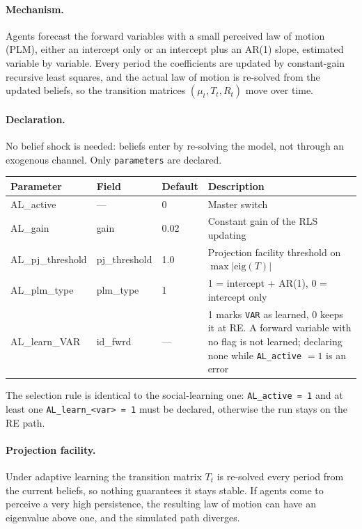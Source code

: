 \documentclass[11pt,a4paper]{article}
\newcommand{\command}[1]{\texttt{#1}}
\begin{document}
\paragraph{Mechanism.} Agents forecast the forward variables with a small
perceived law of motion (PLM), either an intercept only or an intercept plus an
AR(1) slope, estimated variable by variable. Every period the coefficients are
updated by constant-gain recursive least squares, and the actual law of motion
is re-solved from the updated beliefs, so the transition matrices
$(\mu_t, T_t, R_t)$ move over time.


\paragraph{Declaration.} No belief shock is needed: beliefs enter by re-solving
the model, not through an exogenous channel. Only \command{parameters} are
declared.

\begin{longtable}{>{\ttfamily\small}p{4.6cm} >{\ttfamily\small}p{3.2cm} p{1.6cm} p{4.6cm}}
\toprule
\normalfont\textbf{Parameter} & \normalfont\textbf{Field} &
\normalfont\textbf{Default} & \normalfont\textbf{Description} \\
\midrule
\endhead
AL\_active        & ---           & 0    & Master switch \\
AL\_gain          & gain          & 0.02 & Constant gain of the RLS updating \\
AL\_pj\_threshold & pj\_threshold & 1.0  & Projection facility threshold on $\max|\mathrm{eig}(T)|$ \\
AL\_plm\_type     & plm\_type     & 1    & 1 = intercept + AR(1), 0 = intercept only \\
AL\_learn\_VAR    & id\_fwrd      & ---  & 1 marks \texttt{VAR} as learned, 0 keeps it at RE. A forward variable with no flag is not learned; declaring none while \texttt{AL\_active} $=1$ is an error \\
\bottomrule
\end{longtable}

\noindent
The selection rule is identical to the social-learning one: \texttt{AL\_active
= 1} and at least one \texttt{AL\_learn\_<var> = 1} must be declared, otherwise
the run stays on the RE path.


\paragraph{Projection facility.} Under adaptive learning the transition matrix
$T_t$ is re-solved every period from the current beliefs, so nothing guarantees
it stays stable. If agents come to perceive a very high persistence, the
resulting law of motion can have an eigenvalue above one, and the simulated
path diverges.
\end{document}
